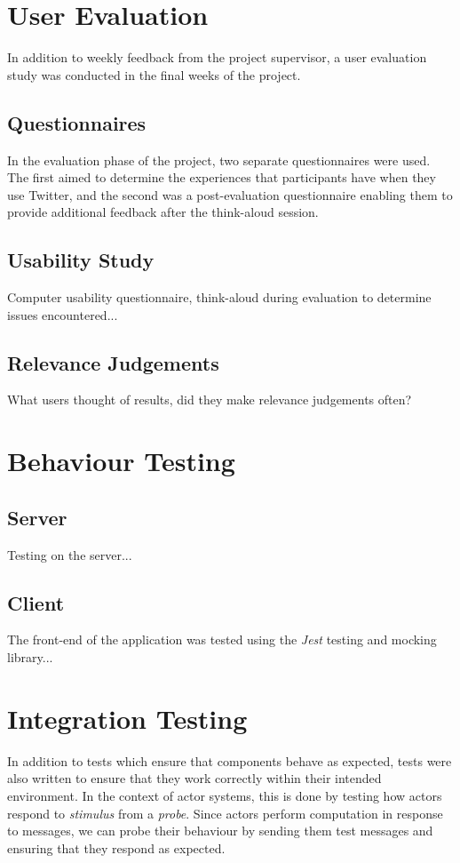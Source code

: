 \documentclass{l4proj}
\begin{document}


\section{User Evaluation}

    In addition to weekly feedback from the project supervisor, a user evaluation study was conducted in the final weeks of the project.

    \subsection{Questionnaires}
    In the evaluation phase of the project, two separate questionnaires were used. The first aimed to determine the experiences that participants have when they use Twitter, and the second was a post-evaluation questionnaire enabling them to provide additional feedback after the think-aloud session.

    \subsection{Usability Study}
    Computer usability questionnaire, think-aloud during evaluation to determine issues encountered...
    
    \subsection{Relevance Judgements}
    What users thought of results, did they make relevance judgements often?

\section{Behaviour Testing}
    \subsection{Server}
    Testing on the server...
    
    \subsection{Client}
        The front-end of the application was tested using the \textit{Jest} testing and mocking library...
        
        
\section{Integration Testing}
    In addition to tests which ensure that components behave as expected, tests were also written to ensure that they work correctly within their intended environment. In the context of actor systems, this is done by testing how actors respond to \textit{stimulus} from a \textit{probe}. Since actors perform computation in response to messages, we can probe their behaviour by sending them test messages and ensuring that they respond as expected.
    
\end{document}
